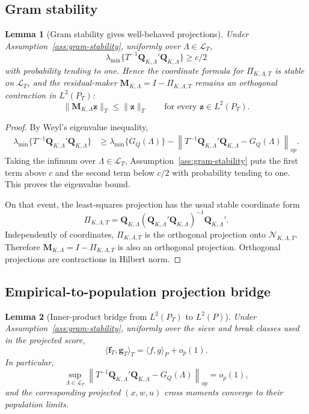 \documentclass[12pt]{article}
\numberwithin{equation}{section}
\newtheorem{lemma}{Lemma}
\theoremstyle{definition}
\newcommand{\op}{o_p}
\newcommand{\N}{\mathcal N}
\newcommand{\LtwoT}{L^2(P_T)}
\newcommand{\innerT}[2]{\langle #1,#2\rangle_T}
\newcommand{\innerP}[2]{\langle #1,#2\rangle_P}
\begin{document}
\subsection{Gram stability}

\begin{lemma}[Gram stability gives well-behaved projections]
\label{lem:part2-gram-stability}
Under Assumption~\ref{ass:gram-stability}, uniformly over
\(\Lambda\in\mathcal L_T\),
\[
    \lambda_{\min}\{T^{-1}\bm Q_{K,\Lambda}'\bm Q_{K,\Lambda}\}\ge c/2
\]
with probability tending to one. Hence the coordinate formula for
\(\Pi_{K,\Lambda,T}\) is stable on \(\mathcal L_T\), and the residual-maker
\(\bm M_{K,\Lambda}=I-\Pi_{K,\Lambda,T}\) remains an orthogonal contraction in
\(\LtwoT\):
\[
    \|\bm M_{K,\Lambda}\bm z\|_T\le \|\bm z\|_T
    \qquad \text{for every }\bm z\in\LtwoT.
\]
\end{lemma}

\begin{proof}
By Weyl's eigenvalue inequality,
\[
\begin{aligned}
\lambda_{\min}\{T^{-1}\bm Q_{K,\Lambda}'\bm Q_{K,\Lambda}\}
&\ge
\lambda_{\min}\{G_Q(\Lambda)\}
-\left\|T^{-1}\bm Q_{K,\Lambda}'\bm Q_{K,\Lambda}-G_Q(\Lambda)\right\|_{op}.
\end{aligned}
\]
Taking the infimum over \(\Lambda\in\mathcal L_T\), Assumption~\ref{ass:gram-stability}
puts the first term above \(c\) and the second term below \(c/2\) with
probability tending to one. This proves the eigenvalue bound.

On that event, the least-squares projection has the usual stable coordinate
form
\[
    \Pi_{K,\Lambda,T}
    =\bm Q_{K,\Lambda}
      (\bm Q_{K,\Lambda}'\bm Q_{K,\Lambda})^{-1}
      \bm Q_{K,\Lambda}'.
\]
Independently of coordinates, \(\Pi_{K,\Lambda,T}\) is the orthogonal projection
onto \(\N_{K,\Lambda,T}\). Therefore
\(\bm M_{K,\Lambda}=I-\Pi_{K,\Lambda,T}\) is also an orthogonal projection.
Orthogonal projections are contractions in Hilbert norm.
\end{proof}

\subsection{Empirical-to-population projection bridge}

\begin{lemma}[Inner-product bridge from \(L^2(P_T)\) to \(L^2(P)\)]
\label{lem:part2-inner-product-bridge}
Under Assumption~\ref{ass:gram-stability}, uniformly over the sieve and break
classes used in the projected score,
\[
    \innerT{\bm f_T}{\bm g_T}=\innerP{f}{g}+\op(1).
\]
In particular,
\[
    \sup_{\Lambda\in\mathcal L_T}
    \left\|T^{-1}\bm Q_{K,\Lambda}'\bm Q_{K,\Lambda}-G_Q(\Lambda)\right\|_{op}
    =\op(1),
\]
and the corresponding projected \((x,w,u)\) cross moments converge to their
population limits.
\end{lemma}
\end{document}
